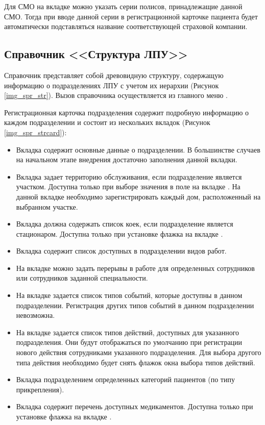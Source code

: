 Для СМО на вкладке  можно указать серии полисов, принадлежащие данной СМО. Тогда при вводе данной серии в регистрационной карточке пациента будет автоматически подставляться название соответствующей страховой компании.

\subsection{Справочник <<Структура ЛПУ>>}

Справочник  представляет собой древовидную структуру, содержащую информацию о подразделениях ЛПУ с учетом их иерархии (Рисунок \ref{img_spr_str}). Вызов справочника осуществляется из главного меню .

Регистрационная карточка подразделения содержит подробную информацию о каждом подразделении и состоит из нескольких вкладок (Рисунок \ref{img_spr_strcard}):
\begin{itemize}
 \item Вкладка  содержит основные данные о подразделении. В большинстве случаев на начальном этапе внедрения достаточно заполнения данной вкладки.
 \item Вкладка  задает территорию обслуживания, если подразделение является участком. Доступна только при выборе значения в поле  на вкладке . На данной вкладке необходимо зарегистрировать каждый дом, расположенный на выбранном участке.
 \item Вкладка  должна содержать список коек, если подразделение является стационаром. Доступна только при установке флажка  на вкладке .
 \item Вкладка  содержит список доступных в подразделении видов работ.
 \item На вкладке  можно задать перерывы в работе для определенных сотрудников или сотрудников заданной специальности.
 \item На вкладке  задается список типов событий, которые доступны в данном подразделении. Регистрация других типов событий в данном подразделении невозможна.
 \item На вкладке  задается список типов действий, доступных для указанного подразделения. Они будут отображаться по умолчанию при регистрации нового действия сотрудниками указанного подразделения. Для выбора другого типа действия необходимо будет снять флажок  окна выбора типов действий.
 \item Вкладка  подразделением определенных категорий пациентов (по типу прикрепления).
 \item Вкладка  содержит перечень доступных медикаментов. Доступна только при установке флажка  на вкладке .
\end{itemize}
 
